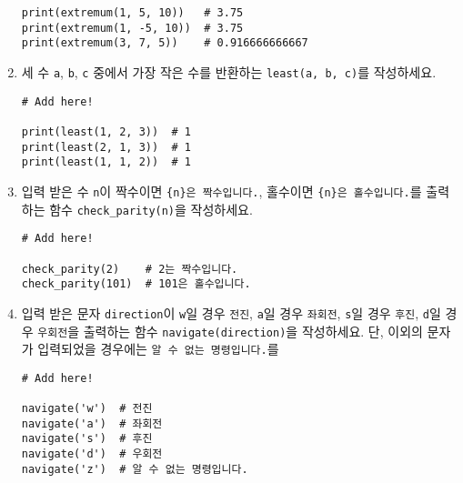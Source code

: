 \documentclass[../main.tex]{subfiles}
\begin{document}
\begin{enumerate}
\begin{verbatim}
print(extremum(1, 5, 10))   # 3.75
print(extremum(1, -5, 10))  # 3.75
print(extremum(3, 7, 5))    # 0.916666666667
\end{verbatim}

\item 세 수 \verb|a|, \verb|b|, \verb|c| 중에서 가장 작은 수를 반환하는 
  \texttt{least(a, b, c)}를 작성하세요.
\begin{verbatim}
# Add here!

print(least(1, 2, 3))  # 1
print(least(2, 1, 3))  # 1
print(least(1, 1, 2))  # 1
\end{verbatim}

\item 입력 받은 수 \verb|n|이 짝수이면 \verb|{n}은 짝수입니다.|, 홀수이면
  \verb|{n}은 홀수입니다.|를 출력하는 함수 \verb|check_parity(n)|을 작성하세요.
\begin{verbatim}
# Add here!

check_parity(2)    # 2는 짝수입니다.
check_parity(101)  # 101은 홀수입니다.
\end{verbatim}

\item 입력 받은 문자 \verb|direction|이 \verb|w|일 경우 \verb|전진|,
  \verb|a|일 경우 \verb|좌회전|, \verb|s|일 경우 \verb|후진|, \verb|d|일 경우
  \verb|우회전|을 출력하는 함수 \verb|navigate(direction)|을 작성하세요.
  단, 이외의 문자가 입력되었을 경우에는 \verb|알 수 없는 명령입니다.|를
 \begin{verbatim}
# Add here!

navigate('w')  # 전진
navigate('a')  # 좌회전
navigate('s')  # 후진
navigate('d')  # 우회전
navigate('z')  # 알 수 없는 명령입니다.
\end{verbatim}


\end{enumerate}
\end{document}
